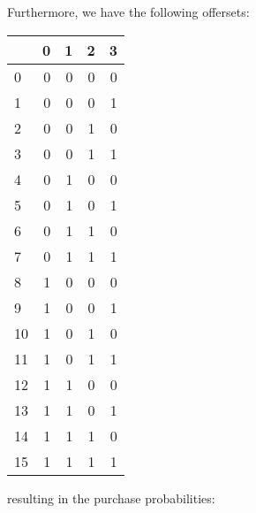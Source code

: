 Furthermore, we have the following offersets:

\begin{table}
	\begin{tabular}{lrrrr}
		\toprule
		{} &  0 &  1 &  2 &  3 \\
		\midrule
		0  &  0 &  0 &  0 &  0 \\
		1  &  0 &  0 &  0 &  1 \\
		2  &  0 &  0 &  1 &  0 \\
		3  &  0 &  0 &  1 &  1 \\
		4  &  0 &  1 &  0 &  0 \\
		5  &  0 &  1 &  0 &  1 \\
		6  &  0 &  1 &  1 &  0 \\
		7  &  0 &  1 &  1 &  1 \\
		8  &  1 &  0 &  0 &  0 \\
		9  &  1 &  0 &  0 &  1 \\
		10 &  1 &  0 &  1 &  0 \\
		11 &  1 &  0 &  1 &  1 \\
		12 &  1 &  1 &  0 &  0 \\
		13 &  1 &  1 &  0 &  1 \\
		14 &  1 &  1 &  1 &  0 \\
		15 &  1 &  1 &  1 &  1 \\
		\bottomrule
	\end{tabular}
	
\end{table}

resulting in the purchase probabilities:

